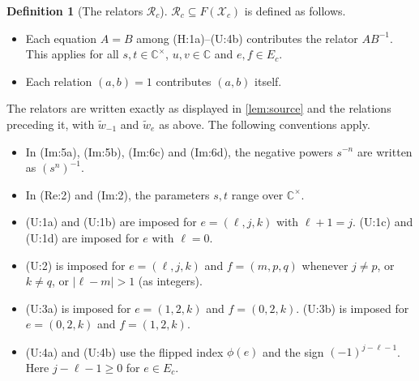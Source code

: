 \documentclass[11pt]{article}
\theoremstyle{definition}
\newtheorem{definition}[theorem]{Definition}
\theoremstyle{remark}
\newcommand{\cX}{\mathcal{X}}
\newcommand{\cR}{\mathcal{R}}
\newcommand{\C}{\mathbb{C}}
\newcommand{\wt}{\widetilde{w}}
\begin{document}
\begin{definition}[The relators $\cR_c$]
$\cR_c\subseteq F(\cX_c)$ is defined as follows.
\begin{itemize}
\item Each equation $A=B$ among (H:1a)--(U:4b) contributes the relator $AB^{-1}$. This applies for all $s,t\in\C^\times$, $u,v\in\C$ and $e,f\in E_c$.
\item Each relation $(a,b)=1$ contributes $(a,b)$ itself.
\end{itemize}
The relators are written exactly as displayed in \cref{lem:source} and the relations preceding it, with $\wt_{-1}$ and $\wt_e$ as above. The following conventions apply.
\begin{itemize}
\item In (Im:5a), (Im:5b), (Im:6c) and (Im:6d), the negative powers $s^{-n}$ are written as $(s^n)^{-1}$.
\item In (Re:2) and (Im:2), the parameters $s,t$ range over $\C^\times$.
\item (U:1a) and (U:1b) are imposed for $e=(\ell,j,k)$ with $\ell+1=j$. (U:1c) and (U:1d) are imposed for $e$ with $\ell=0$.
\item (U:2) is imposed for $e=(\ell,j,k)$ and $f=(m,p,q)$ whenever $j\neq p$, or $k\neq q$, or $|\ell-m|>1$ (as integers).
\item (U:3a) is imposed for $e=(1,2,k)$ and $f=(0,2,k)$. (U:3b) is imposed for $e=(0,2,k)$ and $f=(1,2,k)$.
\item (U:4a) and (U:4b) use the flipped index $\phi(e)$ and the sign $(-1)^{j-\ell-1}$. Here $j-\ell-1\geq0$ for $e\in E_c$.
\end{itemize}
\end{definition}
\end{document}
